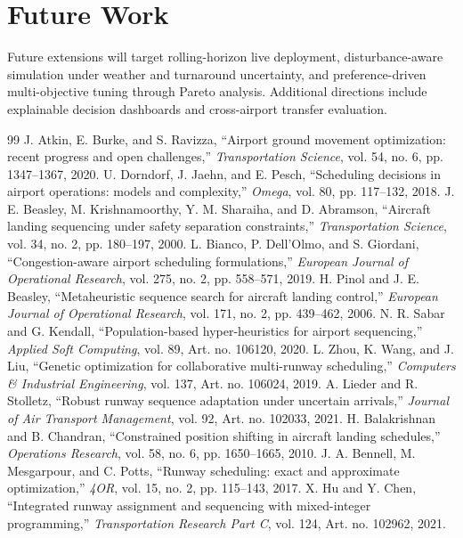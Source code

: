 \documentclass[conference]{IEEEtran}
\begin{document}
\section{Future Work}
Future extensions will target rolling-horizon live deployment, disturbance-aware simulation under weather and turnaround uncertainty, and preference-driven multi-objective tuning through Pareto analysis. Additional directions include explainable decision dashboards and cross-airport transfer evaluation.

\begin{thebibliography}{99}
 J. Atkin, E. Burke, and S. Ravizza, ``Airport ground movement optimization: recent progress and open challenges,'' \emph{Transportation Science}, vol. 54, no. 6, pp. 1347--1367, 2020.
 U. Dorndorf, J. Jaehn, and E. Pesch, ``Scheduling decisions in airport operations: models and complexity,'' \emph{Omega}, vol. 80, pp. 117--132, 2018.
 J. E. Beasley, M. Krishnamoorthy, Y. M. Sharaiha, and D. Abramson, ``Aircraft landing sequencing under safety separation constraints,'' \emph{Transportation Science}, vol. 34, no. 2, pp. 180--197, 2000.
 L. Bianco, P. Dell'Olmo, and S. Giordani, ``Congestion-aware airport scheduling formulations,'' \emph{European Journal of Operational Research}, vol. 275, no. 2, pp. 558--571, 2019.
 H. Pinol and J. E. Beasley, ``Metaheuristic sequence search for aircraft landing control,'' \emph{European Journal of Operational Research}, vol. 171, no. 2, pp. 439--462, 2006.
 N. R. Sabar and G. Kendall, ``Population-based hyper-heuristics for airport sequencing,'' \emph{Applied Soft Computing}, vol. 89, Art. no. 106120, 2020.
 L. Zhou, K. Wang, and J. Liu, ``Genetic optimization for collaborative multi-runway scheduling,'' \emph{Computers \& Industrial Engineering}, vol. 137, Art. no. 106024, 2019.
 A. Lieder and R. Stolletz, ``Robust runway sequence adaptation under uncertain arrivals,'' \emph{Journal of Air Transport Management}, vol. 92, Art. no. 102033, 2021.
 H. Balakrishnan and B. Chandran, ``Constrained position shifting in aircraft landing schedules,'' \emph{Operations Research}, vol. 58, no. 6, pp. 1650--1665, 2010.
 J. A. Bennell, M. Mesgarpour, and C. Potts, ``Runway scheduling: exact and approximate optimization,'' \emph{4OR}, vol. 15, no. 2, pp. 115--143, 2017.
 X. Hu and Y. Chen, ``Integrated runway assignment and sequencing with mixed-integer programming,'' \emph{Transportation Research Part C}, vol. 124, Art. no. 102962, 2021.

\end{thebibliography}
\end{document}
